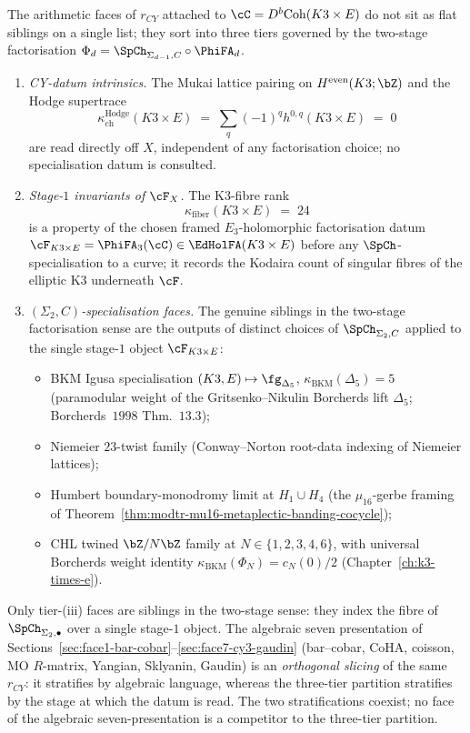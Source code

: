 \begin{theorem}
\label{thm:cy-holdata-three-tier}
The arithmetic faces of $r_{CY}$ attached to $\cC = D^b\mathrm{Coh}(K3 \times E)$
do not sit as flat siblings on a single list; they sort into three tiers
governed by the two-stage factorisation
$\Phi_d = \SpCh_{\Sigma_{d-1},C} \circ \PhiFA_d$.
\begin{enumerate}[label=\textup{(\roman*)},leftmargin=2.4em]
\item \emph{CY-datum intrinsics.} The Mukai lattice pairing on
$H^{\mathrm{even}}(K3; \bZ)$ and the Hodge supertrace
\[
 \kappa_{\mathrm{ch}}^{\mathrm{Hodge}}(K3 \times E)
 \;=\; \sum_q (-1)^q h^{0,q}(K3 \times E)
 \;=\; 0
\]
are read directly off $X$, independent of any factorisation
choice; no specialisation datum is consulted.
\item \emph{Stage-$1$ invariants of $\cF_X$.} The K3-fibre rank
\[
 \kappa_{\mathrm{fiber}}(K3 \times E) \;=\; 24
\]
is a property of the chosen framed $E_3$-holomorphic factorisation datum
$\cF_{K3 \times E} = \PhiFA_3(\cC) \in \EdHolFA(K3 \times E)$
before any $\SpCh$-specialisation to a curve; it records the Kodaira
count of singular fibres of the elliptic K3 underneath $\cF$.
\item \emph{$(\Sigma_2, C)$-specialisation faces.}
The genuine siblings in the two-stage factorisation sense are the
outputs of distinct choices of $\SpCh_{\Sigma_2, C}$ applied to the
single stage-$1$ object $\cF_{K3 \times E}$:
\begin{itemize}
\item BKM Igusa specialisation $(K3, E) \mapsto \fg_{\Delta_5}$,
$\kappa_{\mathrm{BKM}}(\Delta_5) = 5$ (paramodular weight of the Gritsenko--Nikulin
Borcherds lift $\Delta_5$; Borcherds~$1998$ Thm.~$13.3$);
\item Niemeier $23$-twist family
(Conway--Norton root-data indexing of Niemeier lattices);
\item Humbert boundary-monodromy limit at $H_1 \cup H_4$
(the $\mu_{16}$-gerbe framing of
Theorem~\ref{thm:modtr-mu16-metaplectic-banding-cocycle});
\item CHL twined $\bZ/N\bZ$ family at
$N \in \{1, 2, 3, 4, 6\}$, with universal Borcherds weight identity
$\kappa_{\mathrm{BKM}}(\Phi_N) = c_N(0)/2$
(Chapter~\ref{ch:k3-times-e}).
\end{itemize}
\end{enumerate}
Only tier-\textup{(iii)} faces are siblings in the two-stage sense:
they index the fibre of $\SpCh_{\Sigma_2, \bullet}$ over a single
stage-$1$ object. The algebraic seven presentation of
Sections~\ref{sec:face1-bar-cobar}--\ref{sec:face7-cy3-gaudin}
(bar--cobar, CoHA, coisson, MO $R$-matrix, Yangian, Sklyanin, Gaudin)
is an \emph{orthogonal slicing} of the same $r_{CY}$: it stratifies by
algebraic language, whereas the three-tier partition stratifies by the
stage at which the datum is read. The two stratifications coexist; no
face of the algebraic seven-presentation is a competitor to the
three-tier partition.
\end{theorem}

